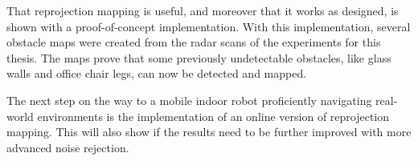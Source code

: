 That reprojection mapping is useful, and moreover that it works as designed, is shown with a proof-of-concept implementation. With this implementation, several obstacle maps were created from the radar scans of the experiments for this thesis. The maps prove that some previously undetectable obstacles, like glass walls and office chair legs, can now be detected and mapped.

The next step on the way to a mobile indoor robot proficiently navigating real-world environments is the implementation of an online version of reprojection mapping. This will also show if the results need to be further improved with more advanced noise rejection.
